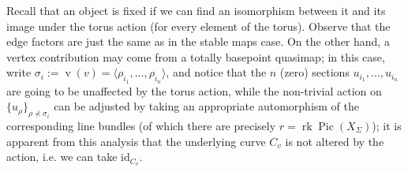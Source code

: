 \documentclass[11pt]{amsart}
\newcommand{\Pic}{\operatorname{Pic}}
\newcommand{\rk}{\operatorname{rk}}
\newcommand{\vv}{\operatorname{v}}
\newcommand{\id}{\mathrm{id}}
\theoremstyle{definition}
\theoremstyle{definition}
\begin{document}
Recall that an object is fixed if we can find an isomorphism between it and its image under the torus action (for every element of the torus). Observe that the edge factors are just the same as in the stable maps case. On the other hand, a vertex contribution may come from a totally basepoint quasimap; in this case, write $\sigma_i:=\vv(v)=\langle \rho_{i_1},\ldots,\rho_{i_n}\rangle$, and notice that the $n$ (zero) sections $u_{i_1},\ldots,u_{i_n}$ are going to be unaffected by the torus action, while the non-trivial action on $\{u_\rho\}_{\rho\nprec\sigma_i}$ can be adjusted by taking an appropriate automorphism of the corresponding line bundles (of which there are precisely $r=\rk\Pic(X_\Sigma)$); it is apparent from this analysis that the underlying curve $C_v$ is not altered by the action, i.e. we can take $\id_{C_v}$.
\end{document}
